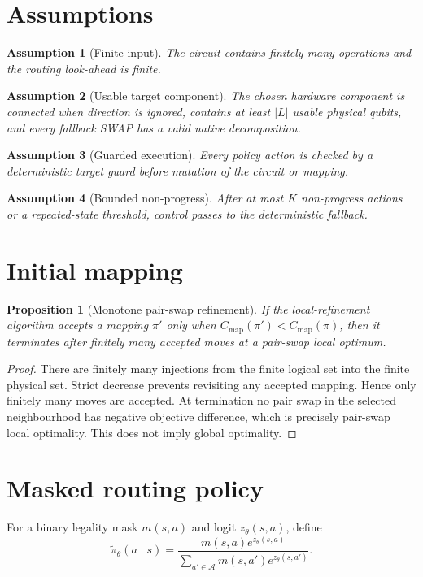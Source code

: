 \documentclass[11pt]{article}
\newtheorem{assumption}{Assumption}
\newtheorem{proposition}{Proposition}
\begin{document}
\section{Assumptions}
\begin{assumption}[Finite input]
The circuit contains finitely many operations and the routing look-ahead is finite.
\end{assumption}
\begin{assumption}[Usable target component]
The chosen hardware component is connected when direction is ignored, contains at least $|L|$ usable physical qubits, and every fallback SWAP has a valid native decomposition.
\end{assumption}
\begin{assumption}[Guarded execution]
Every policy action is checked by a deterministic target guard before mutation of the circuit or mapping.
\end{assumption}
\begin{assumption}[Bounded non-progress]
After at most $K$ non-progress actions or a repeated-state threshold, control passes to the deterministic fallback.
\end{assumption}

\section{Initial mapping}
\begin{proposition}[Monotone pair-swap refinement]
If the local-refinement algorithm accepts a mapping $\pi'$ only when $C_{\mathrm{map}}(\pi')<C_{\mathrm{map}}(\pi)$, then it terminates after finitely many accepted moves at a pair-swap local optimum.
\end{proposition}
\begin{proof}
There are finitely many injections from the finite logical set into the finite physical set. Strict decrease prevents revisiting any accepted mapping. Hence only finitely many moves are accepted. At termination no pair swap in the selected neighbourhood has negative objective difference, which is precisely pair-swap local optimality. This does not imply global optimality.
\end{proof}

\section{Masked routing policy}
For a binary legality mask $m(s,a)$ and logit $z_\theta(s,a)$, define
\begin{equation}
\widetilde\pi_\theta(a\mid s)=
\frac{m(s,a)e^{z_\theta(s,a)}}{\sum_{a'\in\mathcal A}m(s,a')e^{z_\theta(s,a')}}.
\end{equation}
\end{document}
